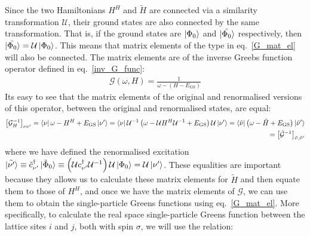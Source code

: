 \documentclass[12pt]{article}
\numberwithin{equation}{section}
\begin{document}
Since the two Hamiltonians $H^H$ and $\tilde H$ are connected via a similarity transformation $\mathcal{U}$, their ground states are also connected by the same transformation. That is, if the ground states are $\ket{\Phi_0}$ and $\ket{\tilde{\Phi_0}}$ respectively, then $\ket{\tilde{\Phi_0}} = \mathcal{U}\ket{\Phi_0}$. This means that matrix elements of the type in eq.~\ref{G_mat_el} will also be connected. The matrix elements are of the inverse Greebs function operator defined in eq.~\ref{inv_G_func}:
 \begin{equation}\begin{aligned}
	 \mathcal{G}(\omega, H) = \frac{1}{\omega - (H - E_\text{GS})}
 \end{aligned}\end{equation}
Its easy to see that the matrix elements of the original and renormalised versions of this operator, between the original and renormalised states, are equal:
\begin{equation}\begin{aligned}
	\left[\mathcal{G}_H^{-1}\right]_{\nu \nu^\prime} = \bra{\nu}\omega - H^H + E_\text{GS}\ket{\nu^\prime} = \bra{\nu} \mathcal{U}^{-1}\left(\omega -  \mathcal{U} H^H  \mathcal{U}^{-1} + E_\text{GS}\right)  \mathcal{U}\ket{\nu^\prime} = \bra{\tilde \nu}\left(\omega - \tilde H + E_\text{GS}\right)\ket{\tilde \nu^\prime}\\
	= \left[\mathcal{\tilde G}^{-1}\right]_{\tilde \nu,\tilde \nu^\prime}
\end{aligned}\end{equation}
where we have defined the renormalised excitation $\ket{\tilde {\nu^\prime}} \equiv \tilde c^\dagger_{\nu^\prime}\ket{\tilde \Phi_0} \equiv  \left(\mathcal{U} c^\dagger_{\nu^\prime}  \mathcal{U}^{-1}\right)  \mathcal{U}\ket{\Phi_0} =  \mathcal{U}\ket{{\nu^\prime}}$. These equalities are important because they allows us to calculate these matrix elements for $\tilde H$ and then equate them to those of $H^H$, and once we have the matrix elements of $\mathcal{G}$, we can use them to obtain the single-particle Greens functions using eq.~\ref{G_mat_el}. More specifically, to calculate the real space single-particle Greens function between the lattice sites $i$ and $j$, both with spin $\sigma$, we will use the relation:
\end{document}

